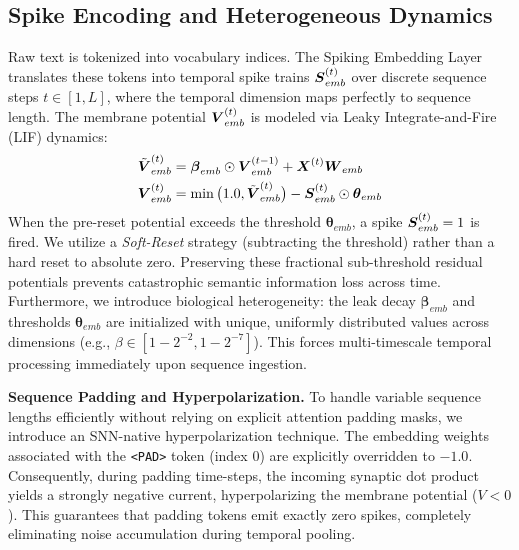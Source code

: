 \documentclass[11pt, conference, compsoc, twoside]{IEEEtran}
\begin{document}
\subsection{Spike Encoding and Heterogeneous Dynamics}
Raw text is tokenized into vocabulary indices. The Spiking Embedding Layer translates these tokens into temporal spike trains $\boldsymbol{S}_{emb}^{(t)}$ over discrete sequence steps $t \in [1, L]$, where the temporal dimension maps perfectly to sequence length. The membrane potential $\boldsymbol{V}_{emb}^{(t)}$ is modeled via Leaky Integrate-and-Fire (LIF) dynamics:
\begin{equation}
\begin{aligned}
\tilde{\boldsymbol{V}}_{emb}^{(t)} &= \boldsymbol{\beta}_{emb} \odot \boldsymbol{V}_{emb}^{(t-1)} + \boldsymbol{X}^{(t)} \boldsymbol{W}_{emb} \\
\boldsymbol{V}_{emb}^{(t)} &= \min\big(1.0, \tilde{\boldsymbol{V}}_{emb}^{(t)}\big) - \boldsymbol{S}_{emb}^{(t)} \odot \boldsymbol{\theta}_{emb}
\end{aligned}
\end{equation}
When the pre-reset potential exceeds the threshold $\bm{\theta}_{emb}$, a spike $\boldsymbol{S}_{emb}^{(t)} = 1$ is fired. We utilize a \textit{Soft-Reset} strategy (subtracting the threshold) rather than a hard reset to absolute zero. Preserving these fractional sub-threshold residual potentials prevents catastrophic semantic information loss across time. Furthermore, we introduce biological heterogeneity: the leak decay $\bm{\beta}_{emb}$ and thresholds $\bm{\theta}_{emb}$ are initialized with unique, uniformly distributed values across dimensions (e.g., $\beta \in [1 - 2^{-2}, 1 - 2^{-7}]$). This forces multi-timescale temporal processing immediately upon sequence ingestion.

\textbf{Sequence Padding and Hyperpolarization.} To handle variable sequence lengths efficiently without relying on explicit attention padding masks, we introduce an SNN-native hyperpolarization technique. The embedding weights associated with the \texttt{<PAD>} token (index 0) are explicitly overridden to $-1.0$. Consequently, during padding time-steps, the incoming synaptic dot product yields a strongly negative current, hyperpolarizing the membrane potential ($V < 0$). This guarantees that padding tokens emit exactly zero spikes, completely eliminating noise accumulation during temporal pooling.
\end{document}
